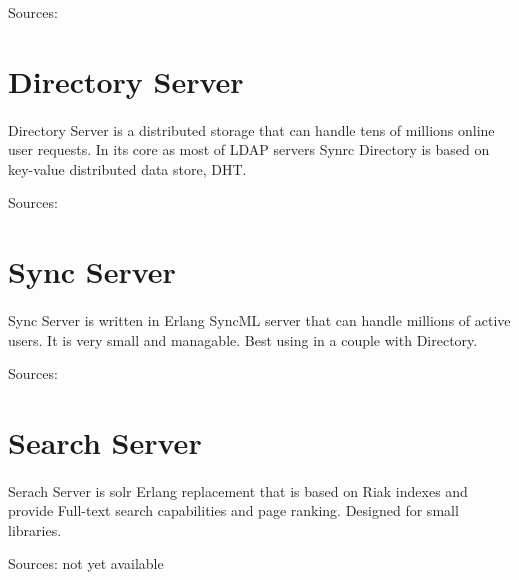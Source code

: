 \documentclass[11pt]{article}
\begin{document}
Sources: 

\section*{Directory Server}
\paragraph{}
Directory Server is a distributed storage that can handle tens of
millions online user requests. 
In its core as most of LDAP servers Synrc Directory is based on
key-value distributed data store, DHT.

Sources: 

\section*{Sync Server}
\paragraph{}
Sync Server is written in Erlang SyncML server that can handle
millions of active users. It is very small and managable.
Best using in a couple with Directory.

Sources: 

\section*{Search Server}
\paragraph{}
Serach Server is solr Erlang replacement that is based on Riak indexes
and provide Full-text search capabilities and page ranking. Designed for small
libraries.

Sources: not yet available

\end{document}
